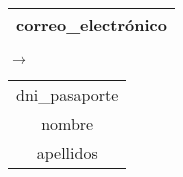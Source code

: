   \begin{center}
    \begin{minipage}{3.7cm}{\begin{tabular}{ | c | }
                  \hline
                  correo\_electrónico \\
                  \hline
                 \end{tabular} }
    \end{minipage}
    \begin{minipage}{0.7cm}{$\longrightarrow$}
    \end{minipage}
    \begin{minipage}{5.9cm}{\begin{tabular}{ | c | }
                  \hline
                  dni\_pasaporte \\
                  nombre \\
                  apellidos \\
                  \hline
                 \end{tabular} }
    \end{minipage}
  \end{center}
